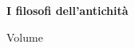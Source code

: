 \begin{titlepage}
  \thispagestyle{empty}
  \centering
  \vspace*{\fill}
  {\fontsize{28}{34}\selectfont\bfseries I filosofi dell'antichità\par}
  \vspace{0.7cm}
  {\Large Volume \NumeroVolume\par}
  \vspace{0.25cm}
  {\large \TitoloVolume\par}
  \ifdefempty{\AutoreVolume}{}{\vspace{1.2cm}{\normalsize \AutoreVolume\par}}
  \vspace*{\fill}
\end{titlepage}
